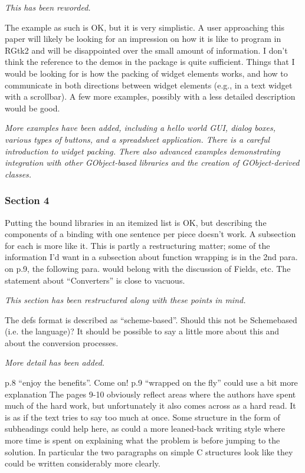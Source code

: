 \documentclass{article}
\begin{document}
\emph{This has been reworded.}

The example as such is OK, but it is very simplistic. A user approaching this
paper will likely be looking for an impression on how it is like to program in
RGtk2 and will be disappointed over the small amount of information. I don't
think the reference to the demos in the package is quite sufficient. Things that
I would be looking for is how the packing of widget elements works, and how to
communicate in both directions between widget elements (e.g., in a text widget
with a scrollbar). A few more examples, possibly with a less detailed description
would be good.

\emph{More examples have been added, including a hello world GUI, dialog boxes, various types of buttons, and a spreadsheet application. 
There is a careful introduction to widget packing. There also advanced examples demonstrating integration with other GObject-based libraries and the creation of GObject-derived classes.}

\subsubsection*{Section 4}

Putting the bound libraries in an itemized list is OK, but describing the components
of a binding with one sentence per piece doesn't work. A subsection
for each is more like it. This is partly a restructuring matter; some of the information
I'd want in a subsection about function wrapping is in the 2nd para.
on p.9, the following para. would belong with the discussion of Fields, etc.
The statement about ``Converters'' is close to vacuous.

\emph{This section has been restructured along with these points in mind.}

The defs format is described as ``scheme-based''. Should this not be Schemebased
(i.e. the language)? It should be possible to say a little more about this
and about the conversion processes.

\emph{More detail has been added.}

p.8 ``enjoy the benefits''. Come on!
p.9 ``wrapped on the fly'' could use a bit more explanation
The pages 9-10 obviously reflect areas where the authors have spent much of the
hard work, but unfortunately it also comes across as a hard read. It is as if the
text tries to say too much at once. Some structure in the form of subheadings
could help here, as could a more leaned-back writing style where more time is
spent on explaining what the problem is before jumping to the solution. In
particular the two paragraphs on simple C structures look like they could be
written considerably more clearly.
\end{document}
